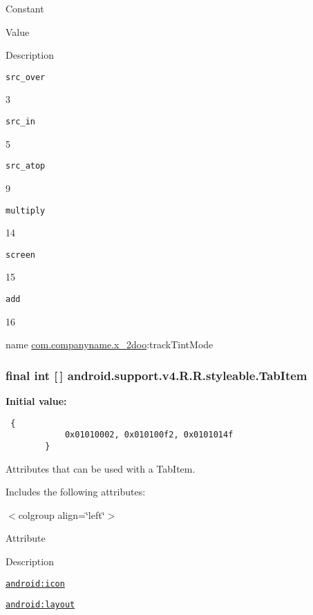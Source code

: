 Constant

Value

Description 

{\tt src\_\-over}

3

{\tt src\_\-in}

5

{\tt src\_\-atop}

9

{\tt multiply}

14

{\tt screen}

15

{\tt add}

16

name \hyperlink{namespacecom_1_1companyname_1_1x__2doo}{com.companyname.x\_\-2doo}:trackTintMode \hypertarget{classandroid_1_1support_1_1v4_1_1_r_1_1styleable_91eab1ea34174d58d08c76c2c097a4b4}{
\subsubsection[{TabItem}]{\setlength{\rightskip}{0pt plus 5cm}final int \mbox{[}$\,$\mbox{]} android.support.v4.R.R.styleable.TabItem}}
\label{classandroid_1_1support_1_1v4_1_1_r_1_1styleable_91eab1ea34174d58d08c76c2c097a4b4}


\textbf{Initial value:}

\begin{Code}\begin{verbatim} {
            0x01010002, 0x010100f2, 0x0101014f
        }
\end{verbatim}
\end{Code}
Attributes that can be used with a TabItem. 

Includes the following attributes: \begin{TabularC}{0}
\hline
\end{TabularC}
$<$colgroup align=\char`\"{}left\char`\"{}$>$ 

Attribute

Description 

{\tt \hyperlink{classandroid_1_1support_1_1v4_1_1_r_1_1styleable_2bfc174d7f5725cca2d71de0e14005c8}{android:icon}}

{\tt \hyperlink{classandroid_1_1support_1_1v4_1_1_r_1_1styleable_4b8fe999918d09fb6a54d5db061df9d3}{android:layout}}

